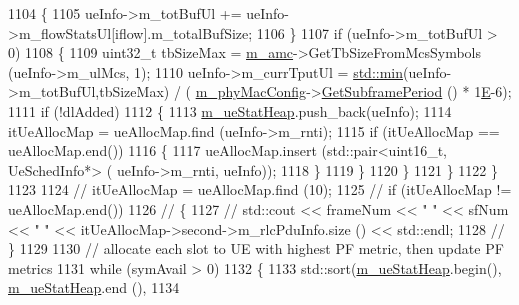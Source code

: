 \begin{DoxyCode}
1104                         \{
1105                                 ueInfo->m\_totBufUl += ueInfo->m\_flowStatsUl[iflow].m\_totalBufSize;
1106                         \}
1107                         \textcolor{keywordflow}{if} (ueInfo->m\_totBufUl > 0)
1108                         \{
1109                                 uint32\_t tbSizeMax = \hyperlink{classns3_1_1MmWaveFlexTtiPfMacScheduler_ab9cf29146f4e3094526de08ffe08b193}{m\_amc}->GetTbSizeFromMcsSymbols (ueInfo->m\_ulMcs, 
      1);
1110                                 ueInfo->m\_currTputUl = \hyperlink{80211b_8c_ac6afabdc09a49a433ee19d8a9486056d}{std::min}(ueInfo->m\_totBufUl,tbSizeMax) / (
      \hyperlink{classns3_1_1MmWaveMacScheduler_a24d7af4971d2e500fe543cefbafa2fd9}{m\_phyMacConfig}->\hyperlink{classns3_1_1MmWavePhyMacCommon_a1d402260d29c8931dd3dde73b295e23d}{GetSubframePeriod} () * 1\hyperlink{packet-test-suite_8cc_a171669980e29849aa5e3722d573181ee}{E}-6);
1111                                 \textcolor{keywordflow}{if} (!dlAdded)
1112                                 \{
1113                                         \hyperlink{classns3_1_1MmWaveFlexTtiPfMacScheduler_afa463c768b5a2c1447cdf48daa3cf412}{m\_ueStatHeap}.push\_back(ueInfo);
1114                                         itUeAllocMap = ueAllocMap.find (ueInfo->m\_rnti);
1115                                         \textcolor{keywordflow}{if} (itUeAllocMap == ueAllocMap.end())
1116                                         \{
1117                                                 ueAllocMap.insert (std::pair<uint16\_t, UeSchedInfo*> (
      ueInfo->m\_rnti, ueInfo));
1118                                         \}
1119                                 \}
1120                         \}
1121                 \}
1122         \}
1123 
1124 \textcolor{comment}{//      itUeAllocMap = ueAllocMap.find (10);}
1125 \textcolor{comment}{//      if (itUeAllocMap != ueAllocMap.end())}
1126 \textcolor{comment}{//      \{}
1127 \textcolor{comment}{//              std::cout << frameNum << " " << sfNum << " " << itUeAllocMap->second->m\_rlcPduInfo.size ()
       << std::endl;}
1128 \textcolor{comment}{//      \}}
1129 
1130         \textcolor{comment}{// allocate each slot to UE with highest PF metric, then update PF metrics}
1131         \textcolor{keywordflow}{while} (symAvail > 0)
1132         \{
1133                 std::sort(\hyperlink{classns3_1_1MmWaveFlexTtiPfMacScheduler_afa463c768b5a2c1447cdf48daa3cf412}{m\_ueStatHeap}.begin(), \hyperlink{classns3_1_1MmWaveFlexTtiPfMacScheduler_afa463c768b5a2c1447cdf48daa3cf412}{m\_ueStatHeap}.end (),
1134                                                         

\end{DoxyCode}
